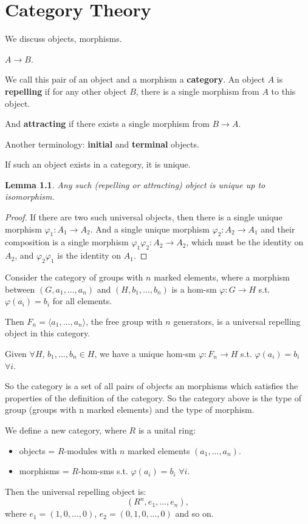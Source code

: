 \documentclass[12pt]{amsbook}
\theoremstyle{plain}
\numberwithin{section}{chapter}
\numberwithin{equation}{chapter}
\newtheorem{lem}[theorem]{Lemma}
\theoremstyle{definition}
\theoremstyle{remark}
\renewcommand{\phi}{\varphi}
\begin{document}
\appendix
%

\chapter{Category Theory}


We discuss objects, morphisms. 

$A \to B$. 

We call this pair of an object and a morphism a \textbf{category}. An object $A$ is \textbf{repelling} if for any other object $B$, there is a single morphism from $A$ to this object. 

And \textbf{attracting} if there exists a single morphism from $B \to A$. 

Another terminology: \textbf{initial} and \textbf{terminal} objects. 

If such an object exists in a category, it is unique. 

\begin{lem}
Any such (repelling or attracting) object is unique up to isomorphism.  

\end{lem}
\begin{proof}
If there are two such universal objects, then there is a single unique morphism $\phi_1:A_1 \to A_2$. And a single unique morphism $\phi_2:A_2 \to A_1$ and their composition is a single morphism $\phi_1\phi_2:A_2 \to A_2$, which must be the identity on $A_2$, and $\phi_2\phi_1$ is the identity on $A_1$. 
\end{proof}

Consider the category of groups with $n$ marked elements, where a morphism between $(G,a_1,...,a_n)$ and $(H,b_1,...,b_n)$ is a hom-sm $\phi:G \to H$ s.t. $\phi(a_i) = b_i$ for all elements. 

Then $F_n = \langle a_1,...,a_n \rangle$, the free group with $n$ generators, is a universal repelling object in this category. 

Given $\forall H$, $b_1,...,b_n \in H$, we have a unique hom-sm $\phi:F_n \to H$ s.t. $\phi(a_i) = b_i$ $\forall i$. 

So the category is a set of all pairs of objects an morphisms which satisfies the properties of the definition of the category. So the category above is the type of group (groups with n marked elements) and the type of morphism. 

We define a new category, where $R$ is a unital ring:
\begin{itemize}
\item objects = $R$-modules with $n$ marked elements $(a_1,...,a_n)$. 
\item morphisms = $R$-hom-sms s.t. $\phi(a_i) =b_i$ $\forall i$. 
\end{itemize}
Then the universal repelling object is:
$$
(R^n,e_1,...,e_n),
$$
where $e_1 = (1,0,...,0)$, $e_2 = (0,1,0,...,0)$ and so on. 
\end{document}
